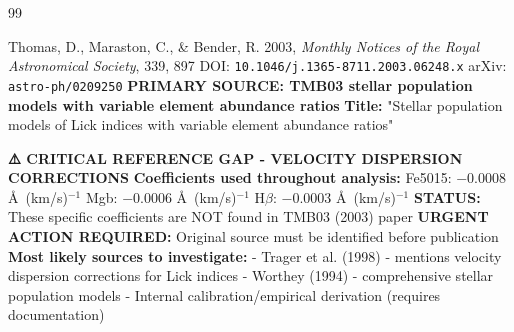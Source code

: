 
\begin{thebibliography}{99}


Thomas, D., Maraston, C., \& Bender, R. 2003, \textit{Monthly Notices of the Royal Astronomical Society}, 339, 897
\newline DOI: \texttt{10.1046/j.1365-8711.2003.06248.x}
\newline arXiv: \texttt{astro-ph/0209250}
\newline \textbf{PRIMARY SOURCE: TMB03 stellar population models with variable element abundance ratios}
\newline \textbf{Title:} "Stellar population models of Lick indices with variable element abundance ratios"


\textbf{⚠️  CRITICAL REFERENCE GAP - VELOCITY DISPERSION CORRECTIONS}
\newline \textbf{Coefficients used throughout analysis:}
\newline Fe5015: $-0.0008$ \AA\ (km/s)$^{-1}$
\newline Mgb: $-0.0006$ \AA\ (km/s)$^{-1}$
\newline H$\beta$: $-0.0003$ \AA\ (km/s)$^{-1}$
\newline \textbf{STATUS:} These specific coefficients are NOT found in TMB03 (2003) paper
\newline \textbf{URGENT ACTION REQUIRED:} Original source must be identified before publication
\newline \textbf{Most likely sources to investigate:}
\newline - Trager et al. (1998) - mentions velocity dispersion corrections for Lick indices
\newline - Worthey (1994) - comprehensive stellar population models
\newline - Internal calibration/empirical derivation (requires documentation)


\end{thebibliography}

